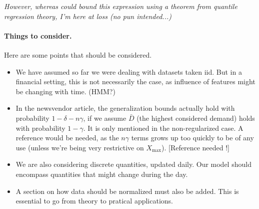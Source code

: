 \textit{However, whereas \cite{rudin2015} could bound this expression using a theorem from
  quantile regression theory, I'm here at loss (no pun intended...)}





\paragraph{Things to consider.}

Here are some points that should be considered.

\begin{itemize}
\item We have assumed so far we were dealing with datasets taken iid. But in a financial
  setting, this is not necessarily the case, as influence of features might be changing
  with time. (HMM?)
\item In the newsvendor article, the generalization bounds actually hold with probability
  $1-\delta - n\gamma$, if we assume $\bar D$ (the highest considered demand) holds with
  probability $1-\gamma$. It is only mentioned in the non-regularized case. A reference
  would be needed, as the $n\gamma$ terms grows up too quickly to be of any use (unless
  we're being very restrictive on $X_{\max}$). [Reference needed !]
\item We are also considering discrete quantities, updated daily. Our model should
  encompass quantities that might change during the day.
\item A section on how data should be normalized must also be added. This is essential to
  go from theory to pratical applications. 
\end{itemize}